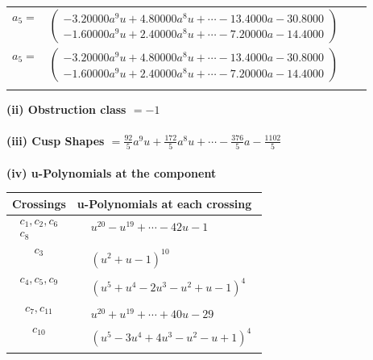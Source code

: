 \documentclass[1p]{elsarticle_modified}
\theoremstyle{definition}
\begin{document}
\begin{tabular}{m{7pt} m{180pt} m{7pt} m{180pt} }
\flushright $a_{5}=$&$\begin{pmatrix}-3.20000 a^{9} u+4.80000 a^{8} u+\cdots-13.4000 a-30.8000\\-1.60000 a^{9} u+2.40000 a^{8} u+\cdots-7.20000 a-14.4000\end{pmatrix}$\\ \flushright $a_{5}=$&$\begin{pmatrix}-3.20000 a^{9} u+4.80000 a^{8} u+\cdots-13.4000 a-30.8000\\-1.60000 a^{9} u+2.40000 a^{8} u+\cdots-7.20000 a-14.4000\end{pmatrix}$\\&\end{tabular}
\flushleft \textbf{(ii) Obstruction class $= -1$}\\~\\
\flushleft \textbf{(iii) Cusp Shapes $= \frac{92}{5} a^9 u+\frac{172}{5} a^8 u+\cdots-\frac{376}{5} a-\frac{1102}{5}$}\\~\\
\newpage\renewcommand{\arraystretch}{1}
\flushleft \textbf{(iv) u-Polynomials at the component}\newline \\
\begin{tabular}{m{50pt}|m{274pt}}
Crossings & \hspace{64pt}u-Polynomials at each crossing \\
\hline $$\begin{aligned}c_{1},c_{2},c_{6}\\c_{8}\end{aligned}$$&$\begin{aligned}
&u^{20}- u^{19}+\cdots-42 u-1
\end{aligned}$\\
\hline $$\begin{aligned}c_{3}\end{aligned}$$&$\begin{aligned}
&(u^2+u-1)^{10}
\end{aligned}$\\
\hline $$\begin{aligned}c_{4},c_{5},c_{9}\end{aligned}$$&$\begin{aligned}
&(u^5+u^4-2 u^3- u^2+u-1)^4
\end{aligned}$\\
\hline $$\begin{aligned}c_{7},c_{11}\end{aligned}$$&$\begin{aligned}
&u^{20}+u^{19}+\cdots+40 u-29
\end{aligned}$\\
\hline $$\begin{aligned}c_{10}\end{aligned}$$&$\begin{aligned}
&(u^5-3 u^4+4 u^3- u^2- u+1)^4
\end{aligned}$\\
\hline
\end{tabular}\\~\\
\end{document}

